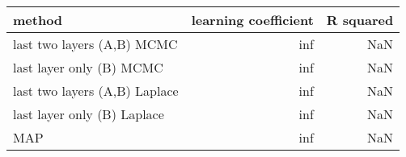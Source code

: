 \begin{tabular}{lrr}
\toprule
                        method &  learning coefficient &  R squared \\
\midrule
    last two layers (A,B) MCMC &                   inf &        NaN \\
      last layer only (B) MCMC &                   inf &        NaN \\
 last two layers (A,B) Laplace &                   inf &        NaN \\
   last layer only (B) Laplace &                   inf &        NaN \\
                           MAP &                   inf &        NaN \\
\bottomrule
\end{tabular}
